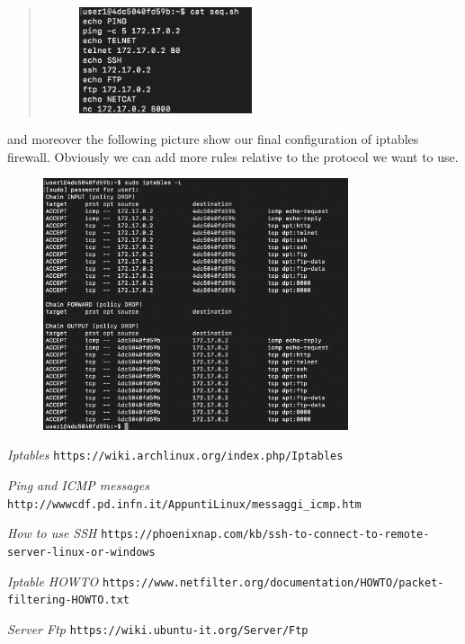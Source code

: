 \documentclass[11pt]{article}
\begin{document}
\begin{quote}
  \begin{figure}[!ht]
    \centering
    \includegraphics[width=0.5\textwidth]{pic10-hw8-1635747.png}
    \label{fig:conf}
  \end{figure}
\end{quote}

and moreover the following picture show our final configuration of iptables firewall. Obviously we can add more rules relative to the protocol we want to use.

\begin{figure}[!ht]
  \centering
  \includegraphics[width=0.8\textwidth]{pic9-hw8-1635747.png}
  \label{fig:conf}
\end{figure}

\vfill
\begin{thebibliography}{99}

{\em Iptables} \newline
\verb|https://wiki.archlinux.org/index.php/Iptables|

{\em Ping and ICMP messages} \newline
\verb|http://wwwcdf.pd.infn.it/AppuntiLinux/messaggi_icmp.htm|

{\em How to use SSH} \newline
\verb|https://phoenixnap.com/kb/ssh-to-connect-to-remote-server-linux-or-windows|

{\em Iptable HOWTO} \newline
\verb|https://www.netfilter.org/documentation/HOWTO/packet-filtering-HOWTO.txt|

{\em Server Ftp}\newline
\verb|https://wiki.ubuntu-it.org/Server/Ftp|

\end{thebibliography}
\end{document}
